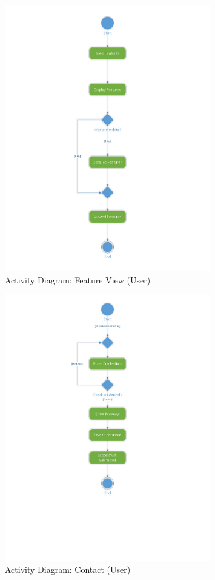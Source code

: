 \documentclass[12pt]{report}
\begin{document}
\begin{figure}[ht]
    \centering
    \includegraphics[width=0.8\textwidth]{Media/Binder2.pdf_Page_10.jpg} %
    \caption{Activity Diagram: Feature View (User)}
    \label{fig:drawing1}
\end{figure}

\begin{figure}[ht]
    \centering
    \includegraphics[width=0.8\textwidth]{Media/Binder2.pdf_Page_11.jpg} %
    \caption{Activity Diagram: Contact (User)}
    \label{fig:drawing1}
\end{figure}
\end{document}
